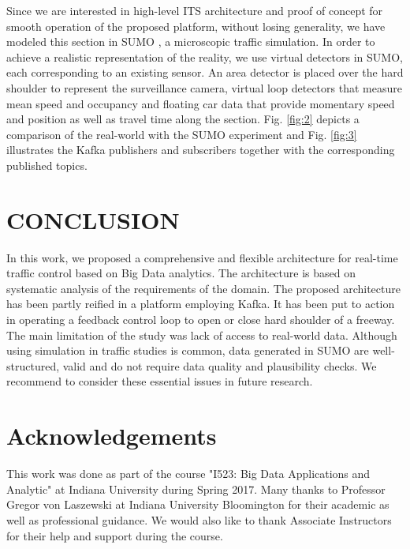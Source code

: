 \documentclass[sigconf]{acmart}
\begin{document}
Since we are interested in high-level ITS architecture and proof of concept for smooth operation of the proposed platform, without losing generality, we have modeled this section in SUMO \cite{sumo}, a microscopic traffic simulation. In order to achieve a realistic representation of the reality, we use virtual detectors in SUMO, each corresponding to an existing sensor. An area detector is placed over the hard shoulder to represent the surveillance camera, virtual loop detectors that measure mean speed and occupancy and floating car data that provide momentary speed and position as well as travel time along the section. Fig. \ref{fig:2} depicts a comparison of the real-world with the SUMO experiment and Fig. \ref{fig:3} illustrates the Kafka publishers and subscribers together with the corresponding published topics.



\section{CONCLUSION}
In this work, we proposed a comprehensive and flexible architecture for real-time traffic control based on Big Data analytics. The architecture is based on systematic analysis of the requirements of the domain. The proposed architecture has been partly reified in a platform employing Kafka. It has been put to action in operating a feedback control loop to open or close hard shoulder of a freeway. The main limitation of the study was lack of access to real-world data. Although using simulation in traffic studies is common, data generated in SUMO are well-structured, valid and do not require data quality and plausibility checks. We recommend to consider these essential issues in future research.

\section*{Acknowledgements}

This work was done as part of the course "I523: Big Data Applications and Analytic" at Indiana University during Spring 2017. Many thanks to Professor Gregor von Laszewski at Indiana University Bloomington for their academic as well as professional guidance. We would also like to thank Associate Instructors for their help and support during the course. 



\end{document}
